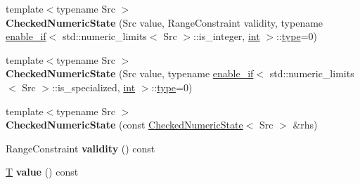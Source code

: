\begin{DoxyCompactItemize}
\item 
\mbox{\label{classv8_1_1base_1_1internal_1_1CheckedNumericState_3_01T_00_01NUMERIC__FLOATING_01_4_a9b8cfdde69fe925db58b7ffaeac4ec37}} 
{\footnotesize template$<$typename Src $>$ }\\{\bfseries Checked\+Numeric\+State} (Src value, Range\+Constraint validity, typename \mbox{\hyperlink{structv8_1_1base_1_1internal_1_1enable__if}{enable\+\_\+if}}$<$ std\+::numeric\+\_\+limits$<$ Src $>$\+::is\+\_\+integer, \mbox{\hyperlink{classint}{int}} $>$\+::\mbox{\hyperlink{classstd_1_1conditional_1_1type}{type}}=0)
\item 
\mbox{\label{classv8_1_1base_1_1internal_1_1CheckedNumericState_3_01T_00_01NUMERIC__FLOATING_01_4_aa7e847241abcd0a9d98b71c8b7b79b98}} 
{\footnotesize template$<$typename Src $>$ }\\{\bfseries Checked\+Numeric\+State} (Src value, typename \mbox{\hyperlink{structv8_1_1base_1_1internal_1_1enable__if}{enable\+\_\+if}}$<$ std\+::numeric\+\_\+limits$<$ Src $>$\+::is\+\_\+specialized, \mbox{\hyperlink{classint}{int}} $>$\+::\mbox{\hyperlink{classstd_1_1conditional_1_1type}{type}}=0)
\item 
\mbox{\label{classv8_1_1base_1_1internal_1_1CheckedNumericState_3_01T_00_01NUMERIC__FLOATING_01_4_a2aabd9445b3a36be3220f685000d4579}} 
{\footnotesize template$<$typename Src $>$ }\\{\bfseries Checked\+Numeric\+State} (const \mbox{\hyperlink{classv8_1_1base_1_1internal_1_1CheckedNumericState}{Checked\+Numeric\+State}}$<$ Src $>$ \&rhs)
\item 
\mbox{\label{classv8_1_1base_1_1internal_1_1CheckedNumericState_3_01T_00_01NUMERIC__FLOATING_01_4_aebbb231defbd7e1716d68917dcec6737}} 
Range\+Constraint {\bfseries validity} () const
\item 
\mbox{\label{classv8_1_1base_1_1internal_1_1CheckedNumericState_3_01T_00_01NUMERIC__FLOATING_01_4_a375c0334e1d26e9523872f6d107368d6}} 
\mbox{\hyperlink{classv8_1_1internal_1_1torque_1_1T}{T}} {\bfseries value} () const
\end{DoxyCompactItemize}
